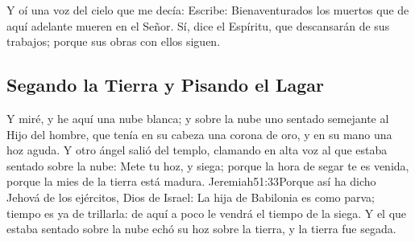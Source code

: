 Y oí una voz del cielo que me decía: Escribe: Bienaventurados los muertos que de aquí adelante mueren en el Señor. Sí, dice el Espíritu, que descansarán de sus trabajos; porque sus obras con ellos siguen.
\subsection*{Segando la Tierra y Pisando el Lagar}
Y miré, y he aquí una nube blanca; y sobre la nube uno sentado semejante al Hijo del hombre,%
 que tenía en su cabeza una corona de oro, y en su mano una hoz aguda. 
Y otro ángel salió del templo, clamando en alta voz al que estaba sentado sobre la nube: Mete tu hoz, y siega; porque la hora de segar te es venida, porque la mies de la tierra está madura.%
				  {Jeremiah}{51:33}{Porque así ha dicho Jehová de los ejércitos, Dios de Israel: La hija de Babilonia es como parva; tiempo es ya de trillarla: de aquí a poco le vendrá el tiempo de la siega.}
Y el que estaba sentado sobre la nube echó su hoz sobre la tierra, y la tierra fue segada.

